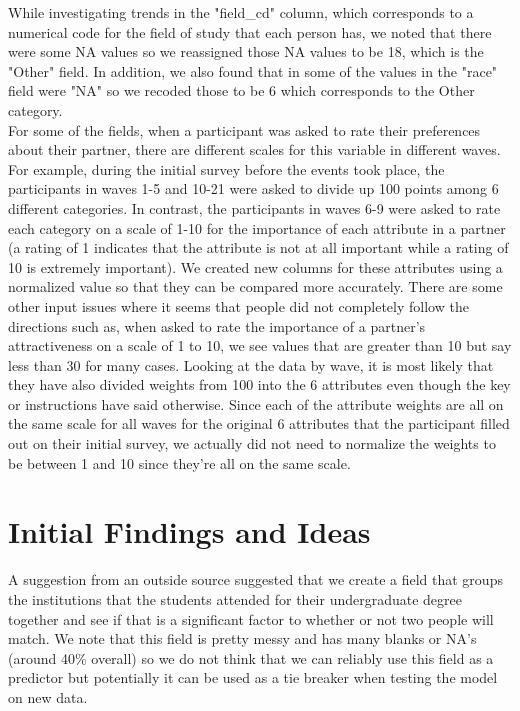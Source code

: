 \documentclass{article}
\begin{document}
While investigating trends in the "field\_cd" column, which corresponds to a numerical code for the field of study that each person has, we noted that there were some NA values  so we reassigned those NA values to be 18, which is the "Other" field.  In addition, we also found that in some of the values in the "race" field were "NA" so we recoded those to be 6 which corresponds to the Other category.\\

For some of the fields, when a participant was asked to rate their preferences about their partner, there are different scales for this variable in different waves.  For example, during the initial survey before the events took place, the participants in waves 1-5 and 10-21 were asked to divide up 100 points among 6 different categories.  In contrast, the participants in waves 6-9 were asked to rate each category on a scale of 1-10 for the importance of each attribute in a partner (a rating of 1 indicates that the attribute is not at all important while a rating of 10 is extremely important).  We created new columns for these attributes using a normalized value so that they can be compared more accurately. There are some other input issues where it seems that people did not completely follow the directions such as, when asked to rate the importance of a partner's attractiveness on a scale of 1 to 10, we see values that are greater than 10 but say less than 30 for many cases. Looking at the data by wave, it is most likely that they have also divided weights from 100 into the 6 attributes even though the key or instructions have said otherwise. Since each of the attribute weights are all on the same scale for all waves for the original 6 attributes that the participant filled out on their initial survey, we actually did not need to normalize the weights to be between 1 and 10 since they're all on the same scale.

\section{Initial Findings and Ideas}
A suggestion from an outside source suggested that we create a field that groups the institutions that the students attended for their undergraduate degree together and see if that is a significant factor to whether or not two people will match.  We note that this field is pretty messy and has many blanks or NA's (around 40\% overall) so we do not think that we can reliably use this field as a predictor but potentially it can be used as a tie breaker when testing the model on new data.\\
\end{document}
